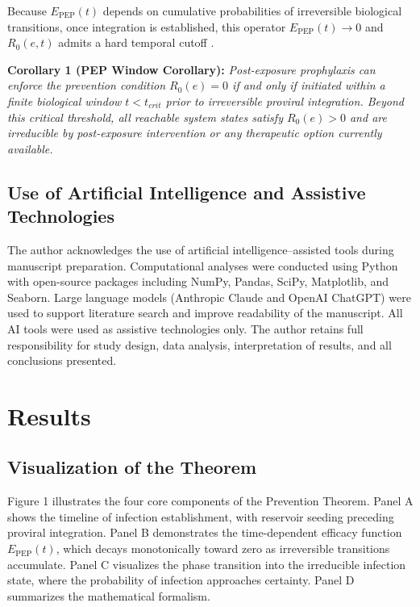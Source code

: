 \documentclass[12pt]{article}
\begin{document}
Because $E_{\text{PEP}}(t)$ depends on cumulative probabilities of irreversible biological transitions, once integration is established, this operator $E_{\mathrm{PEP}}(t)\to 0$ and $R_0(e,t)$ admits a hard temporal cutoff \cite{tanner_npep_2025}.

\textbf{Corollary 1 (PEP Window Corollary):} \textit{Post-exposure prophylaxis can enforce the prevention condition $R_0(e)=0$ if and only if initiated within a finite biological window $t < t_{crit}$ prior to irreversible proviral integration. Beyond this critical threshold, all reachable system states satisfy $R_0(e)>0$ and are irreducible by post-exposure intervention or any therapeutic option currently available.}

\subsection{Use of Artificial Intelligence and Assistive Technologies}

The author acknowledges the use of artificial intelligence--assisted tools during manuscript preparation. Computational analyses were conducted using Python with open-source packages including NumPy, Pandas, SciPy, Matplotlib, and Seaborn. Large language models (Anthropic Claude and OpenAI ChatGPT) were used to support literature search and improve readability of the manuscript. All AI tools were used as assistive technologies only. The author retains full responsibility for study design, data analysis, interpretation of results, and all conclusions presented.

\section{Results}

\subsection{Visualization of the Theorem}

Figure 1 illustrates the four core components of the Prevention Theorem. Panel A shows the timeline of infection establishment, with reservoir seeding preceding proviral integration. Panel B demonstrates the time-dependent efficacy function $E_{\mathrm{PEP}}(t)$, which decays monotonically toward zero as irreversible transitions accumulate. Panel C visualizes the phase transition into the irreducible infection state, where the probability of infection approaches certainty. Panel D summarizes the mathematical formalism.
\end{document}
